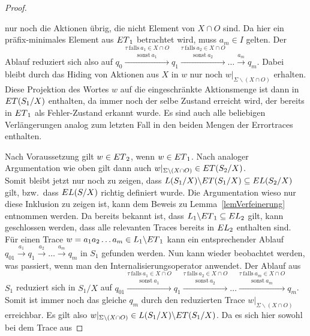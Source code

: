\begin{proof}
\begin{itemize}
      nur noch die Aktionen übrig, die nicht Element von $X\cap O$ sind. Da
      hier ein präfix-minimales Element aus $ET{}_1$ betrachtet wird, muss
      $a_m\in I$ gelten. Der Ablauf reduziert sich also auf
      $q_0 \overset{\tau~\mathrm{falls}~a_1\in X\cap
      O}{\overset{\mathrm{sonst}~a_1}{\longrightarrow}} q_1
      \overset{\tau~\mathrm{falls}~a_2\in X\cap
      O}{\overset{\mathrm{sonst}~a_2}{\longrightarrow}} \dots
      \overset{a_m}{\rightarrow} q_m$. Dabei bleibt durch das Hiding von
      Aktionen aus $X$ in $w$ nur noch $w|_{\Sigma\backslash (X\cap O)}$
      erhalten. Diese Projektion des Wortes $w$ auf die eingeschränkte
      Aktionsmenge ist dann in $ET{}(S_1/X)$ enthalten, da immer noch der
      selbe Zustand erreicht wird, der bereits in $ET{}_1$ als Fehler-Zustand
      erkannt wurde. Es sind auch alle beliebigen Verlängerungen analog zum
      letzten Fall in den beiden Mengen der Errortraces enthalten.
  \end{itemize}
  Nach Voraussetzung gilt $w\in ET{}_2$, wenn $w\in ET{}_1$. Nach analoger
  Argumentation wie oben gilt dann auch $w|_{\Sigma\backslash (X\cap
  O)}\in ET{}(S_2/X)$.\\
  Somit bleibt jetzt nur noch zu zeigen, dass $L(S_1/X)\backslash ET{}(S_1/X)
  \subseteq EL(S_2/X)$ gilt, bzw.\ dass $EL{}(S/X)$ richtig definiert wurde.
  Die Argumentation wieso nur diese Inklusion zu zeigen ist, kann dem Beweis zu
  Lemma~\ref{lemVerfeinerung} entnommen werden. Da bereits bekannt ist, dass
  $L_1\backslash ET{}_1\subseteq EL{}_2$ gilt, kann geschlossen werden, dass
  alle relevanten Traces bereits in $EL{}_2$ enthalten sind. Für einen Trace
  $w=a_1a_2\dots a_m\in L_1\backslash ET{}_1$ kann ein entsprechender Ablauf
  $q_{01} \overset{a_1}{\rightarrow} q_1 \overset{a_2}{\rightarrow} \dots
  \overset{a_m}{\rightarrow} q_m$ in $S_1$ gefunden werden. Nun kann wieder
  beobachtet werden, was passiert, wenn man den Internalisierungsoperator
  anwendet. Der Ablauf aus $S_1$ reduziert sich in $S_1/X$ auf $q_{01}
  \overset{\tau~\mathrm{falls}~a_1\in X\cap
  O}{\overset{\mathrm{sonst}~a_1}{\longrightarrow}} q_1
  \overset{\tau~\mathrm{falls}~a_2\in X\cap
  O}{\overset{\mathrm{sonst}~a_2}{\longrightarrow}} \dots
  \overset{\tau~\mathrm{falls}~a_m\in X\cap
  O}{\overset{\mathrm{sonst}~a_m}{\longrightarrow}} q_m$. Somit ist immer noch
  das gleiche $q_m$ durch den reduzierten Trace $w|_{\Sigma\backslash (X\cap
  O)}$ erreichbar. Es gilt also $w|_{\Sigma\backslash (X\cap O)}\in
  L(S_1/X)\backslash ET{}(S_1/X)$. Da es sich hier sowohl bei dem Trace aus

\end{proof}
